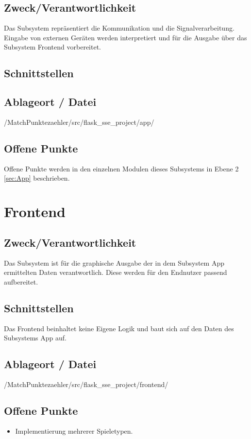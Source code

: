 \subsection*{Zweck/Verantwortlichkeit}
Das Subsystem repräsentiert die Kommunikation und  die Signalverarbeitung. Eingabe von externen Geräten werden interpretiert und für die Ausgabe über das Subsystem Frontend vorbereitet.
\subsection*{Schnittstellen}
\subsection*{Ablageort / Datei}
/MatchPunktezaehler/src/flask\_sse\_project/app/
\subsection*{Offene Punkte}
Offene Punkte werden in den einzelnen Modulen dieses Subsystems in Ebene 2 \ref{sec:App} beschrieben.

\section{Frontend}
\subsection*{Zweck/Verantwortlichkeit}
Das Subsystem ist für die graphische Ausgabe der in dem Subsystem App ermittelten Daten verantwortlich. Diese werden für den Endnutzer passend aufbereitet.
\subsection*{Schnittstellen}
Das Frontend beinhaltet keine Eigene Logik und baut sich auf den Daten des Subsystems App auf.
\subsection*{Ablageort / Datei}
/MatchPunktezaehler/src/flask\_sse\_project/frontend/
\subsection*{Offene Punkte}
\begin{itemize}
	\item Implementierung mehrerer Spieletypen.
\end{itemize}


